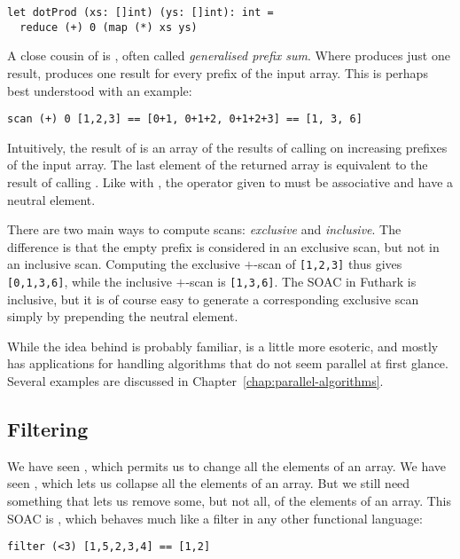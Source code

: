 \documentclass[oneside,11pt]{book}
\begin{document}
\begin{lstlisting}
let dotProd (xs: []int) (ys: []int): int =
  reduce (+) 0 (map (*) xs ys)
\end{lstlisting}

A close cousin of  is , often called
\textit{generalised prefix sum}.  Where  produces just
one result,  produces one result for every prefix of the
input array.  This is perhaps best understood with an example:

\begin{lstlisting}
scan (+) 0 [1,2,3] == [0+1, 0+1+2, 0+1+2+3] == [1, 3, 6]
\end{lstlisting}

Intuitively, the result of  is an array of the results of calling
 on increasing prefixes of the input array.  The last
element of the returned array is equivalent to the result of calling
. Like with , the operator given to
 must be associative and have a neutral element.

There are two main ways to compute scans: \textit{exclusive} and
\textit{inclusive}.  The difference is that the empty prefix is
considered in an exclusive scan, but not in an inclusive scan.
Computing the exclusive $+$-scan of \texttt{[1,2,3]} thus gives
\texttt{[0,1,3,6]}, while the inclusive $+$-scan is \texttt{[1,3,6]}.
The  SOAC in Futhark is inclusive, but it is of course
easy to generate a corresponding exclusive scan simply by prepending
the neutral element.

While the idea behind  is probably familiar,
 is a little more esoteric, and mostly has applications
for handling algorithms that do not seem parallel at first glance.
Several examples are discussed in
Chapter~\ref{chap:parallel-algorithms}.

\subsection{Filtering}

We have seen , which permits us to change all the elements
of an array.  We have seen , which lets us collapse all
the elements of an array.  But we still need something that lets us
remove some, but not all, of the elements of an array.  This SOAC is
, which behaves much like a filter in any other
functional language:

\begin{lstlisting}
filter (<3) [1,5,2,3,4] == [1,2]
\end{lstlisting}
\end{document}
